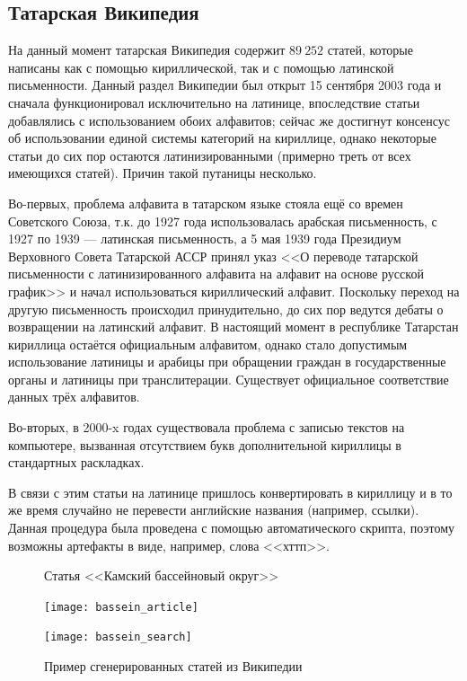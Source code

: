 \subsection{Татарская Википедия}

На данный момент татарская Википедия содержит $89\ 252$ статей, которые написаны как с помощью кириллической, так и с помощью латинской письменности. Данный раздел Википедии был открыт 15 сентября 2003 года и сначала функционировал исключительно на латинице, впоследствие статьи добавлялись с использованием обоих алфавитов; сейчас же достигнут консенсус об использовании единой системы категорий на кириллице, однако некоторые статьи до сих пор остаются латинизированными (примерно треть от всех имеющихся статей). Причин такой путаницы несколько. 

Во-первых, проблема алфавита в татарском языке стояла ещё со времен Советского Союза, т.к. до 1927 года использовалась арабская письменность, с 1927 по 1939 --- латинская письменность, а 5 мая 1939 года Президиум Верховного Совета Татарской АССР принял указ <<О переводе татарской письменности с латинизированного алфавита на алфавит на основе русской график>> и начал использоваться кириллический алфавит. Поскольку переход на другую письменность происходил принудительно, до сих пор ведутся дебаты о возвращении на латинский алфавит. В настоящий момент в республике Татарстан кириллица остаётся официальным алфавитом, однако стало допустимым использование латиницы и арабицы при обращении граждан в государственные органы и латиницы при транслитерации. Существует официальное соответствие данных трёх алфавитов.

Во-вторых, в 2000-x годах существовала проблема с записью текстов на компьютере, вызванная отсутствием букв дополнительной кириллицы в стандартных раскладках.

В связи с этим статьи на латинице пришлось конвертировать в кириллицу и в то же время случайно не перевести английские названия (например, ссылки). Данная процедура была проведена с помощью автоматического скрипта, поэтому возможны артефакты в виде, например, слова <<хттп>>.

\begin{figure}[H]
\begin{minipage}{\textwidth}
\caption{Статья <<Камский бассейновый округ>>}
\texttt{[image: bassein\_article]}
\label{fig:bassein_article}
\end{minipage}

\begin{minipage}{\textwidth}
\caption{Пример сгенерированных статей из Википедии}
\texttt{[image: bassein\_search]}
\label{fig:bassein_search}
\end{minipage}
\end{figure}


